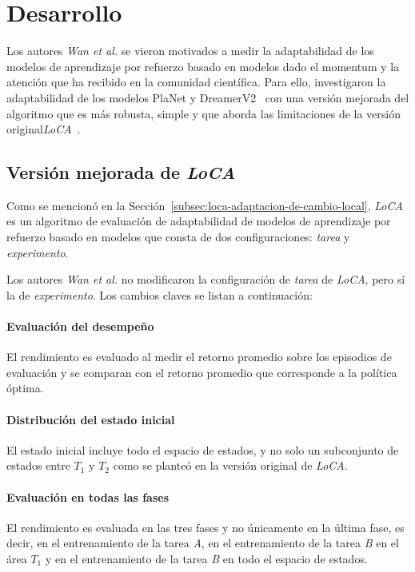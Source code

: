 \section{Desarrollo}\label{sec:desarrollo}

Los autores \textit{Wan et al.} se vieron motivados a medir la adaptabilidad de los modelos de aprendizaje por refuerzo basado en modelos dado el momentum y la atención que ha recibido en la comunidad científica.
Para ello, investigaron la adaptabilidad de los modelos PlaNet y DreamerV2~\cite{PlaNet_and_DreamerV2_2019} con una versión mejorada del algoritmo que es más robusta, simple y que aborda las limitaciones de la versión original\textit{LoCA}~\cite{YiWan_2022}.

\subsection{Versión mejorada de \textit{LoCA}}\label{subsec:version-mejorada-de-textit{loca}}

Como se mencionó en la Sección~\ref{subsec:loca-adaptacion-de-cambio-local}, \textit{LoCA} es un algoritmo de evaluación de adaptabilidad de modelos de aprendizaje por refuerzo basado en modelos que consta de dos configuraciones: \textit{tarea} y \textit{experimento}.

Los autores \textit{Wan et al.} no modificaron la configuración de \textit{tarea} de \textit{LoCA}, pero sí la de \textit{experimento}.
Los cambios claves se listan a continuación:

\paragraph{Evaluación del desempeño}
El rendimiento es evaluado al medir el retorno promedio sobre los episodios de evaluación y se comparan con el retorno promedio que corresponde a la política óptima.

\paragraph{Distribución del estado inicial}
El estado inicial incluye todo el espacio de estados, y no solo un subconjunto de estados entre $T_1$ y $T_2$ como se planteó en la versión original de \textit{LoCA}.

\paragraph{Evaluación en todas las fases}
El rendimiento es evaluada en las tres fases y no únicamente en la última fase, es decir, en el entrenamiento de la tarea \textit{A}, en el entrenamiento de la tarea \textit{B} en el área $T_1$ y en el entrenamiento de la tarea \textit{B} en todo el espacio de estados.

